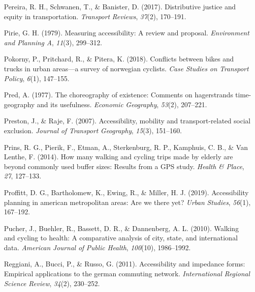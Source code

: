 \documentclass[
11pt, %
oneside, %
english, %
singlespacing, %
]{macthesis} %
\newlength{\cslhangindent}
\newenvironment{CSLReferences}[2] %
 {%
  \setlength{\parindent}{0pt}
  \ifodd #1 \everypar{\setlength{\hangindent}{\cslhangindent}}\ignorespaces\fi
  \ifnum #2 > 0
  \setlength{\parskip}{#2\baselineskip}
  \fi
 }%
 {}
\begin{document}
\begin{CSLReferences}{1}{0}
\leavevmode{}%
Pereira, R. H., Schwanen, T., \& Banister, D. (2017). Distributive justice and equity in transportation. \emph{Transport Reviews}, \emph{37}(2), 170--191.

\leavevmode{}%
Pirie, G. H. (1979). Measuring accessibility: A review and proposal. \emph{Environment and Planning A}, \emph{11}(3), 299--312.

\leavevmode{}%
Pokorny, P., Pritchard, R., \& Pitera, K. (2018). Conflicts between bikes and trucks in urban areas---a survey of norwegian cyclists. \emph{Case Studies on Transport Policy}, \emph{6}(1), 147--155.

\leavevmode{}%
Pred, A. (1977). The choreography of existence: Comments on hagerstrands time-geography and its usefulness. \emph{Economic Geography}, \emph{53}(2), 207--221.

\leavevmode{}%
Preston, J., \& Raje, F. (2007). Accessibility, mobility and transport-related social exclusion. \emph{Journal of Transport Geography}, \emph{15}(3), 151--160.

\leavevmode{}%
Prins, R. G., Pierik, F., Etman, A., Sterkenburg, R. P., Kamphuis, C. B., \& Van Lenthe, F. (2014). How many walking and cycling trips made by elderly are beyond commonly used buffer sizes: Results from a GPS study. \emph{Health \& Place}, \emph{27}, 127--133.

\leavevmode{}%
Proffitt, D. G., Bartholomew, K., Ewing, R., \& Miller, H. J. (2019). Accessibility planning in american metropolitan areas: Are we there yet? \emph{Urban Studies}, \emph{56}(1), 167--192.

\leavevmode{}%
Pucher, J., Buehler, R., Bassett, D. R., \& Dannenberg, A. L. (2010). Walking and cycling to health: A comparative analysis of city, state, and international data. \emph{American Journal of Public Health}, \emph{100}(10), 1986--1992.

\leavevmode{}%
Reggiani, A., Bucci, P., \& Russo, G. (2011). Accessibility and impedance forms: Empirical applications to the german commuting network. \emph{International Regional Science Review}, \emph{34}(2), 230--252.


\end{CSLReferences}
\end{document}
